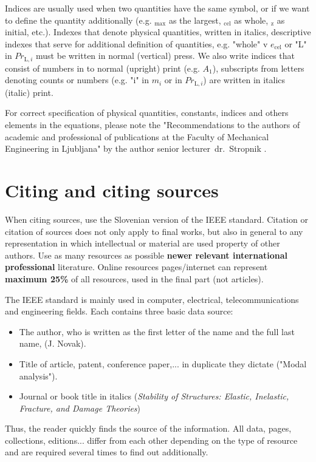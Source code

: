 Indices are usually used when two quantities have the same symbol, or if
we want to define the quantity additionally (e.g. $_{\text{max}}$ as the largest,
$_{\text{cel}}$ as whole, $_{\text{z}}$ as initial, etc.). Indexes that
denote physical quantities, written in italics, descriptive
indexes that serve for additional definition of quantities, e.g. "whole" v
$e_{\text{cel}}$ or "L" in $Pr_{\text{L},i}$ must be written in normal
(vertical) press. We also write indices that consist of numbers in
to normal (upright) print (e.g. $A_1$), subscripts from letters denoting counts
or numbers (e.g. "i" in $m_i$ or in $Pr_{\text{L},i}$) are written in italics
(italic) print.

For correct specification of physical quantities, constants, indices and others
elements in the equations, please note the "Recommendations to the authors of academic and professional
of publications at the Faculty of Mechanical Engineering in Ljubljana" by the author
senior lecturer~dr.~Stropnik \cite{stropnik_1997}.

\section{Citing and citing sources}\label{sec:citing}

When citing sources, use the Slovenian version of the IEEE standard. Citation
or citation of sources does not only apply to final works, but also in general to
any representation in which intellectual or material are used
property of other authors. Use as many resources as possible
\textbf{newer relevant international professional} literature. Online resources
pages/internet can represent \textbf{maximum 25\%} of all resources,
used in the final part (not articles).

The IEEE standard is mainly used in computer, electrical,
telecommunications and engineering fields. Each contains three basic data
source:
\begin{itemize}
\item The author, who is written as the first letter of the name and the full last name, (J.
Novak).
\item Title of article, patent, conference paper,... in duplicate
they dictate ("Modal analysis").
\item Journal or book title in italics (\emph{Stability of
Structures: Elastic, Inelastic, Fracture, and Damage Theories})
\end{itemize}
Thus, the reader quickly finds the source of the information. All data, pages, collections,
editions... differ from each other depending on the type of resource and are required
several times to find out additionally.

